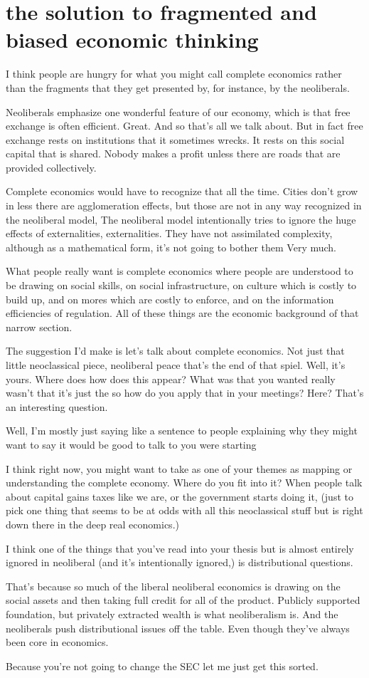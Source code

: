 \section{the solution to fragmented and biased economic thinking}
I think people are hungry for what you might call complete economics rather than the fragments that they get presented by, for instance, by the neoliberals. 

Neoliberals emphasize one wonderful feature of our economy, which is that free exchange is often efficient. Great. And so that's all we talk about. But in fact free exchange rests on institutions that it sometimes wrecks. It rests on this social capital that is shared. Nobody makes a profit unless there are roads that are provided collectively. 

Complete economics would have to recognize that all the time. Cities don't grow in less there are agglomeration effects, but those are not in any way recognized in the neoliberal model, The neoliberal model intentionally tries to ignore the huge effects of externalities, externalities. They have not assimilated complexity, although as a mathematical form, it's not going to bother them Very much. 

What people really want is complete economics where people are understood to be drawing on  social skills, on social infrastructure, on culture which is costly to build up, and on mores which are costly to enforce, and on the information efficiencies of regulation. All of these things are the economic background of that narrow section. 

The suggestion I'd make is let's talk about complete economics. Not just that little neoclassical piece, neoliberal peace that's the end of that spiel. Well, it's yours. Where does how does this appear? What was that you wanted really wasn't that it's just the so how do you apply that in your meetings? Here? That's an interesting question.

Well, I'm mostly just saying like a sentence to people explaining why they might want to say it would be good to talk to you were starting

I think right now, you might want to take as one of your themes as mapping or understanding the complete economy.  Where do you fit into it? When people talk about capital gains taxes like we are, or the government starts doing it, (just to pick one thing that seems to be at odds with all this neoclassical stuff  but is right down there in the deep real economics.) 

I think one of the things that you've read into your thesis but is almost entirely ignored in neoliberal (and it's intentionally ignored,) is distributional questions. 

That's because so much of the liberal neoliberal economics is drawing on the social assets and then taking full credit for all of the product. Publicly supported foundation, but privately extracted wealth is what neoliberalism is. And the neoliberals push distributional issues off the table. Even though they've always been core in economics.

Because you're not going to change the SEC let me just get this sorted.
